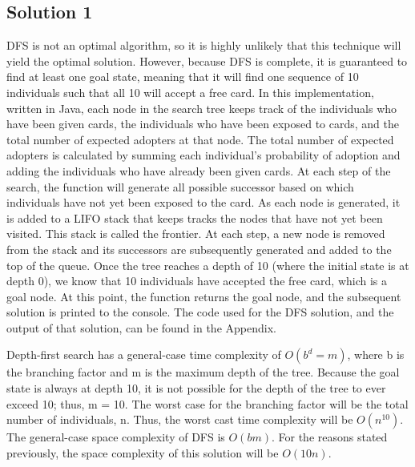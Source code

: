 \documentclass[11pt,journal]{IEEEtran}
\begin{document}
\subsection{Solution 1}
DFS is not an optimal algorithm, so it is highly unlikely that this technique will yield the optimal solution. However, because DFS is complete, it is guaranteed to find at least one goal state, meaning that it will find one sequence of 10 individuals such that all 10 will accept a free card. In this implementation, written in Java, each node in the search tree keeps track of the individuals who have been given cards, the individuals who have been exposed to cards, and the total number of expected adopters at that node. The total number of expected adopters is calculated by summing each individual's probability of adoption and adding the individuals who have already been given cards. At each step of the search, the function will generate all possible successor based on which individuals have not yet been exposed to the card. As each node is generated, it is added to a LIFO stack that keeps tracks the nodes that have not yet been visited. This stack is called the frontier. At each step, a new node is removed from the stack and its successors are subsequently generated and added to the top of the queue. Once the tree reaches a depth of 10 (where the initial state is at depth 0), we know that 10 individuals have accepted the free card, which is a goal node. At this point, the function returns the goal node, and the subsequent solution is printed to the console. The code used for the DFS solution, and the output of that solution, can be found in the Appendix.

Depth-first search has a general-case time complexity of $O(b^d=m)$, where b is the branching factor and m is the maximum depth of the tree. Because the goal state is always at depth 10, it is not possible for the depth of the tree to ever exceed 10; thus, m = 10. The worst case for the branching factor will be the total number of individuals, n. Thus, the worst cast time complexity will be $O(n^{10})$. The general-case space complexity of DFS is $O(bm)$. For the reasons stated previously, the space complexity of this solution will be $O(10n)$.
\end{document}
